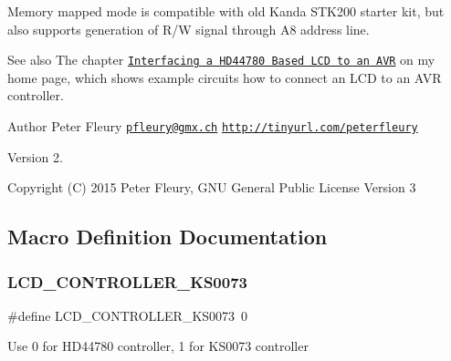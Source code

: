 Memory mapped mode is compatible with old Kanda S\+T\+K200 starter kit, but also supports generation of R/W signal through A8 address line.

\begin{DoxySeeAlso}{See also}
The chapter \href{ http://homepage.hispeed.ch/peterfleury/avr-lcd44780.html}{\tt Interfacing a H\+D44780 Based L\+CD to an A\+VR} on my home page, which shows example circuits how to connect an L\+CD to an A\+VR controller.
\end{DoxySeeAlso}
\begin{DoxyAuthor}{Author}
Peter Fleury \href{mailto:pfleury@gmx.ch}{\tt pfleury@gmx.\+ch} \href{http://tinyurl.com/peterfleury}{\tt http\+://tinyurl.\+com/peterfleury}
\end{DoxyAuthor}
\begin{DoxyVersion}{Version}
2.
\end{DoxyVersion}
\begin{DoxyCopyright}{Copyright}
(C) 2015 Peter Fleury, G\+NU General Public License Version 3 
\end{DoxyCopyright}


\subsection{Macro Definition Documentation}
\mbox{\label{group__pfleury__lcd_ga63574b03f72a197aeee823aae95dc3b7}} 
\subsubsection{\texorpdfstring{L\+C\+D\+\_\+\+C\+O\+N\+T\+R\+O\+L\+L\+E\+R\+\_\+\+K\+S0073}{LCD\_CONTROLLER\_KS0073}}
{\footnotesize\ttfamily \#define L\+C\+D\+\_\+\+C\+O\+N\+T\+R\+O\+L\+L\+E\+R\+\_\+\+K\+S0073~0}

Use 0 for H\+D44780 controller, 1 for K\+S0073 controller \mbox{\label{group__pfleury__lcd_ga79ca3fe83448ab158a4c566bf292c260}} 
